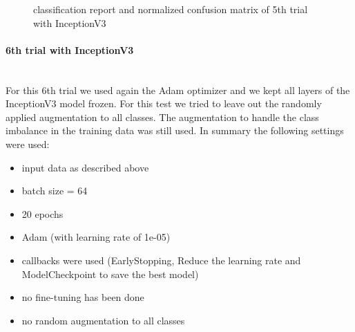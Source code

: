 \documentclass{article}
\begin{document}
\begin{figure}%
  \centering
  \qquad
  \caption{classification report and normalized confusion matrix of 5th trial with InceptionV3}
  \label{fig:inceptionv3_08_results}
\end{figure}

\paragraph{6th trial with InceptionV3}\mbox{}\\

For this 6th trial we used again the Adam optimizer and we kept all layers of the InceptionV3 model frozen. For this test we tried to leave out the randomly applied augmentation to all classes. The augmentation to handle the class imbalance in the training data was still used. In summary the following settings were used: 
\begin{itemize}
\item input data as described above
\item batch size = 64
\item 20 epochs 
\item Adam (with learning rate of 1e-05)
\item callbacks were used (EarlyStopping, Reduce the learning rate and ModelCheckpoint to save the best model)
\item no fine-tuning has been done
\item no random augmentation to all classes 
\end{itemize}
\end{document}
